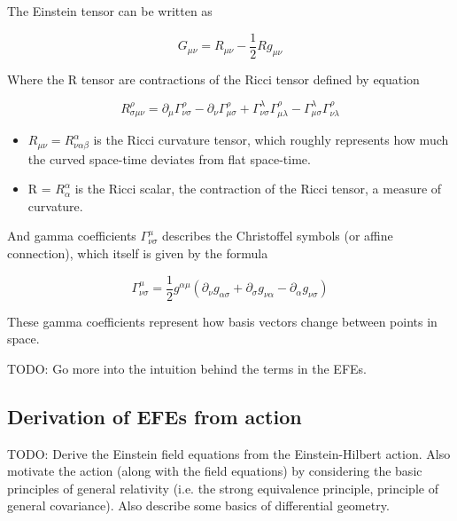The Einstein tensor can be written as

\begin{equation}
    G_{\mu \nu } = R_{\mu \nu} - \frac{1}{2} R g_{\mu \nu}
\label{eq:Einstein tensor}
\end{equation}

Where the R tensor are contractions of the Ricci tensor defined by equation 

\begin{equation}
    R_{\sigma \mu \nu }^{\rho }=\partial_{\mu} \Gamma _{\nu \sigma }^{\rho }-\partial_\nu \Gamma _{\mu \sigma }^{\rho }+\Gamma _{\nu \sigma }^{\lambda } \Gamma _{\mu \lambda }^{\rho }-\Gamma _{\mu \sigma }^{\lambda } \Gamma _{\nu \lambda }^{\rho }
\label{eq:Riemann tesnor}
\end{equation}


\begin{itemize}
    \item $R_{\mu \nu} = R^{\alpha}_{\nu \alpha \beta}$ is the Ricci curvature tensor, which roughly represents how much the curved space-time deviates from flat space-time.
    \item R = $R^{\alpha}_{\alpha}$ is the Ricci scalar, the contraction of the Ricci tensor, a measure of curvature.
\end{itemize}

And gamma coefficients $\Gamma^{\mu}_{\nu \sigma}$ describes the Christoffel symbols (or affine connection), which itself is given by the formula

\begin{equation}
    \Gamma^{\mu}_{\nu \sigma} = \frac{1}{2} g^{\alpha \mu} (\partial_{\nu}g_{\alpha \sigma}+\partial_{\sigma} g_{\nu \alpha} - \partial_{\alpha} g_{\nu \sigma})
\label{eq:Christoffel symbol}
\end{equation}

These gamma coefficients represent how basis vectors change between points in space.

TODO: Go more into the intuition behind the terms in the EFEs.

\subsection{Derivation of EFEs from action}

TODO: Derive the Einstein field equations from the Einstein-Hilbert action. Also motivate the action (along with the field equations) by considering the basic principles of general relativity (i.e. the strong equivalence principle, principle of general covariance). Also describe some basics of differential geometry.


